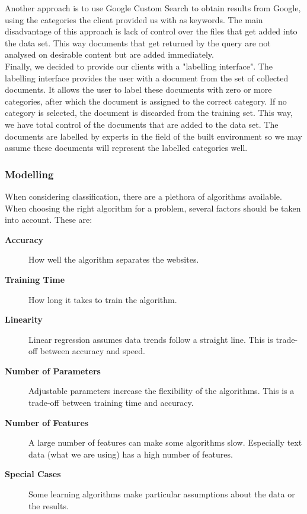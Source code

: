 Another approach is to use Google Custom Search to obtain results from Google, using the categories the client provided us with as keywords. The main disadvantage of this approach is lack of control over the files that get added into the data set. This way documents that get returned by the query are not analysed on desirable content but are added immediately.\\

Finally, we decided to provide our clients with a "labelling interface". The labelling interface provides the user with a document from the set of collected documents. It allows the user to label these documents with zero or more categories, after which the document is assigned to the correct category. If no category is selected, the document is discarded from the training set. This way, we have total control of the documents that are added to the data set. The documents are labelled by experts in the field of the built environment so we may assume these documents will represent the labelled categories well. 

\subsubsection{Modelling}
When considering classification, there are a plethora of algorithms available. When choosing the right algorithm for a problem, several factors should be taken into account\cite{MLCheatSheet}. These are:
    \begin{description}
        \item[\textbf{Accuracy}] How well the algorithm separates the websites.
        \item[\textbf{Training Time}] How long it takes to train the algorithm.
        \item[\textbf{Linearity}] Linear regression assumes data trends follow a straight line. This is trade-off between accuracy and speed.
        \item[\textbf{Number of Parameters}] Adjustable parameters increase the flexibility of the algorithms. This is a trade-off between training time and accuracy.
        \item[\textbf{Number of Features}] A large number of features can make some algorithms slow. Especially text data (what we are using) has a high number of features.
        \item[\textbf{Special Cases}] Some learning algorithms make particular assumptions about the data or the results.
    \end{description}

